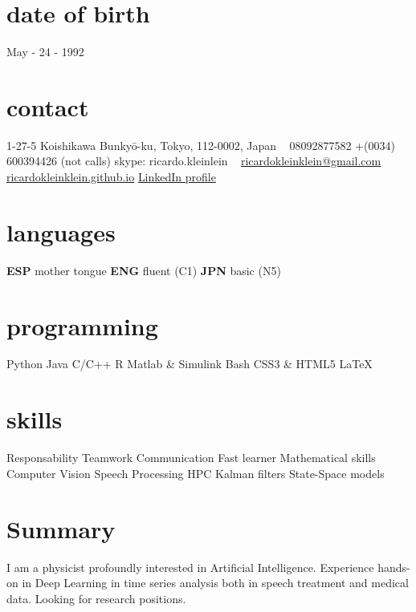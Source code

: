 \documentclass[]{friggeri-cv-a4}
\begin{document}


\begin{aside} %
\section{date of birth}
May - 24 - 1992
\section{contact}
1-27-5 Koishikawa
Bunkyō-ku, Tokyo, 112-0002,
Japan
~
08092877582
+(0034) 600394426 (not calls)
skype: ricardo.kleinlein
~
{\scriptsize \href{mailto:ricardokleinklein@gmail.com}{ricardokleinklein@gmail.com} }
{\scriptsize \href{https://ricardokleinklein.github.io}{ricardokleinklein.github.io} }
{\small \href{https://www.linkedin.com/in/rfaundezcarrasco}{LinkedIn profile} }
\section{languages}
\textbf{ESP} mother tongue
\textbf{ENG} fluent (C1)
\textbf{JPN} basic (N5)
\section{programming}
Python
Java
C/C++
R
Matlab \& Simulink
Bash
CSS3 \& HTML5
\LaTeX
\section{skills}
Responsability
Teamwork
Communication
Fast learner
Mathematical skills
Computer Vision
Speech Processing
HPC
Kalman filters
State-Space models
\end{aside}

\section{Summary}
I am a physicist profoundly interested in Artificial Intelligence. Experience hands-on in Deep Learning in time series analysis both in speech treatment and medical data. Looking for research positions.
\end{document}
